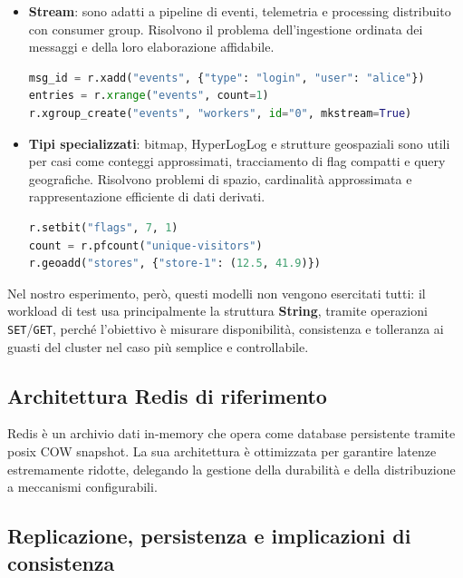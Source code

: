 \documentclass{article}
\begin{document}
\begin{itemize}
\begin{lstlisting}[language=Python]
    \end{lstlisting}
    \item \textbf{Stream}: sono adatti a pipeline di eventi, telemetria e processing distribuito con consumer group. %
Risolvono il problema dell'ingestione ordinata dei messaggi e della loro elaborazione affidabile.
    \begin{lstlisting}[language=Python]
msg_id = r.xadd("events", {"type": "login", "user": "alice"})
entries = r.xrange("events", count=1)
r.xgroup_create("events", "workers", id="0", mkstream=True)
    \end{lstlisting}
    \item \textbf{Tipi specializzati}: bitmap, HyperLogLog e strutture geospaziali sono utili per casi come %
conteggi approssimati, tracciamento di flag compatti e query geografiche. Risolvono problemi di spazio, %
cardinalità approssimata e rappresentazione efficiente di dati derivati.
    \begin{lstlisting}[language=Python]
r.setbit("flags", 7, 1)
count = r.pfcount("unique-visitors")
r.geoadd("stores", {"store-1": (12.5, 41.9)})
    \end{lstlisting}
\end{itemize}

Nel nostro esperimento, però, questi modelli non vengono esercitati tutti: il workload di test usa %
principalmente la struttura \textbf{String}, tramite operazioni \texttt{SET}/\texttt{GET}, perché l'obiettivo è %
misurare disponibilità, consistenza e tolleranza ai guasti del cluster nel caso più semplice e controllabile.



\subsection{Architettura Redis di riferimento}

Redis è un archivio dati in-memory che opera come database persistente tramite posix %
COW snapshot. La sua architettura è ottimizzata per garantire latenze estremamente %
ridotte, delegando la gestione della durabilità e della distribuzione a meccanismi %
configurabili. 

\subsection{Replicazione, persistenza e implicazioni di consistenza}
\end{document}
